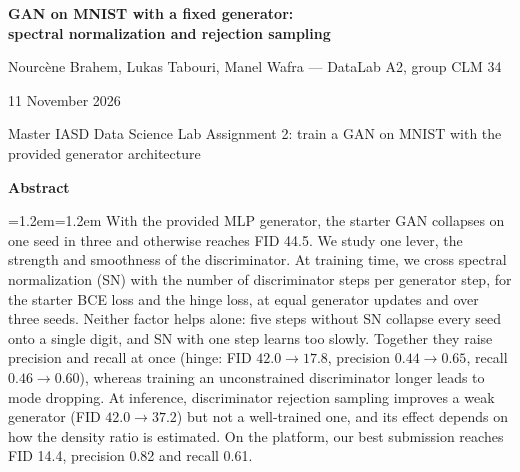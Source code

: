\documentclass[10pt,a4paper]{article}
\begin{document}
\begin{titlepage}
\centering
\vspace*{3.5cm}
{\LARGE\bfseries GAN on MNIST with a fixed generator:\\[4pt]
spectral normalization and rejection sampling\par}
\vspace{1.2cm}
{\large Nourcène Brahem, Lukas Tabouri, Manel Wafra --- DataLab A2, group CLM 34\par}
\vspace{0.5cm}
{\large 11 November 2026\par}
\vspace{1.5cm}
{\normalsize Master IASD \textperiodcentered{} Data Science Lab \textperiodcentered{} Assignment 2: train a GAN on MNIST with the provided generator architecture\par}
\vfill
\end{titlepage}
\setcounter{page}{1}

\begin{center}\textbf{Abstract}\end{center}
\vspace{-4pt}
{\small\leftskip=1.2em\rightskip=1.2em
With the provided MLP generator, the starter GAN collapses on one seed in three and otherwise reaches FID 44.5. We study one lever, the strength and smoothness of the discriminator. At training time, we cross spectral normalization (SN) with the number of discriminator steps per generator step, for the starter BCE loss and the hinge loss, at equal generator updates and over three seeds. Neither factor helps alone: five steps without SN collapse every seed onto a single digit, and SN with one step learns too slowly. Together they raise precision and recall at once (hinge: FID $42.0\to17.8$, precision $0.44\to0.65$, recall $0.46\to0.60$), whereas training an unconstrained discriminator longer leads to mode dropping. At inference, discriminator rejection sampling improves a weak generator (FID $42.0\to37.2$) but not a well-trained one, and its effect depends on how the density ratio is estimated. On the platform, our best submission reaches FID 14.4, precision 0.82 and recall 0.61.\par}
\vspace{2pt}
\end{document}
